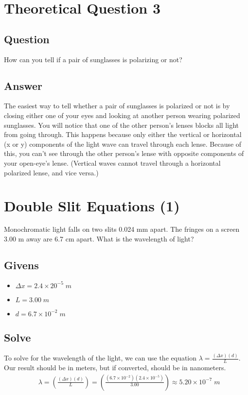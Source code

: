 \documentclass{article}
\begin{document}
\section{Theoretical Question 3}
\subsection*{Question}
How can you tell if a pair of sunglasses is polarizing or not?
\subsection*{Answer}
The easiest way to tell whether a pair of sunglasses is polarized or not is by closing either one of your eyes and looking at another person wearing polarized sunglasses. You will notice that one of the other person's lenses blocks all light from going through. This happens because only either the vertical or horizontal (x or y) components of the light wave can travel through each lense. Because of this, you can't see through the other person's lense with opposite components of your open-eye's lense.  (Vertical waves cannot travel through a horizontal polarized lense, and vice versa.)\\



\section{Double Slit Equations (1)}
Monochromatic light falls on two slits 0.024 mm apart. The fringes on a screen 3.00 m away are 6.7 cm apart. What is the wavelength of light?
\subsection*{Givens}
\begin{itemize}
    \item $\Delta x = 2.4 \times 20^{-5}\;m$
    \item $L = 3.00\;m $
    \item $d = 6.7 \times 10^{-2}\;m$
\end{itemize}\leavevmode

\subsection*{Solve}
To solve for the wavelength of the light, we can use the equation $\lambda = \frac{(\Delta x)(d)}{L}$. Our result should be in meters, but if converted, should be in nanometers.\\
\begin{align*}
     & \lambda = \left(\frac{(\Delta x)(d)}{L}\right)      = \left(\frac{(6.7 \times 10^{-2})(2.4 \times 10^{-5})}{3.00}\right) \approx 5.20 \times 10^{-7}\;m
\end{align*}\leavevmode\\\\\\\\
\end{document}
